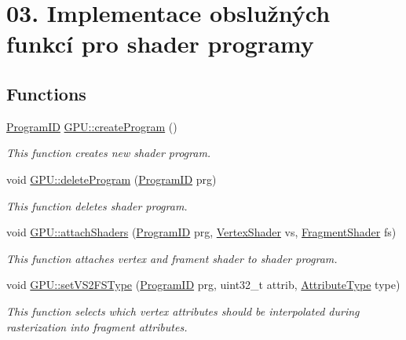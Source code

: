 \hypertarget{group__program__tasks}{}\section{03. Implementace obslužných funkcí pro shader programy}
\label{group__program__tasks}
\subsection*{Functions}
\begin{DoxyCompactItemize}
\item 
\hyperlink{fwd_8hpp_a46ffd067c21ab50f5f1fcfed5d8bfc15}{Program\+ID} \hyperlink{group__program__tasks_gae1368a616ba5be607b9cf4dd1e60dfe0}{G\+P\+U\+::create\+Program} ()
\begin{DoxyCompactList}\small\item\em This function creates new shader program. \end{DoxyCompactList}\item 
void \hyperlink{group__program__tasks_ga3f8363f9c27c3f900f258e6acee52683}{G\+P\+U\+::delete\+Program} (\hyperlink{fwd_8hpp_a46ffd067c21ab50f5f1fcfed5d8bfc15}{Program\+ID} prg)
\begin{DoxyCompactList}\small\item\em This function deletes shader program. \end{DoxyCompactList}\item 
void \hyperlink{group__program__tasks_gafe72b55028369d1e9e9f8d087c76af09}{G\+P\+U\+::attach\+Shaders} (\hyperlink{fwd_8hpp_a46ffd067c21ab50f5f1fcfed5d8bfc15}{Program\+ID} prg, \hyperlink{fwd_8hpp_af647cdb302d7e978c6a0da41a0a92725}{Vertex\+Shader} vs, \hyperlink{fwd_8hpp_a52f1704ae0b129e49fe1902e05319ad6}{Fragment\+Shader} fs)
\begin{DoxyCompactList}\small\item\em This function attaches vertex and frament shader to shader program. \end{DoxyCompactList}\item 
void \hyperlink{group__program__tasks_gaff499d4f692ea0dd7125bfd324957619}{G\+P\+U\+::set\+V\+S2\+F\+S\+Type} (\hyperlink{fwd_8hpp_a46ffd067c21ab50f5f1fcfed5d8bfc15}{Program\+ID} prg, uint32\+\_\+t attrib, \hyperlink{fwd_8hpp_a349a9cde14be8097df865ba0469c0ab2}{Attribute\+Type} type)
\begin{DoxyCompactList}\small\item\em This function selects which vertex attributes should be interpolated during rasterization into fragment attributes. \end{DoxyCompactList}\item 

\end{DoxyCompactItemize}
